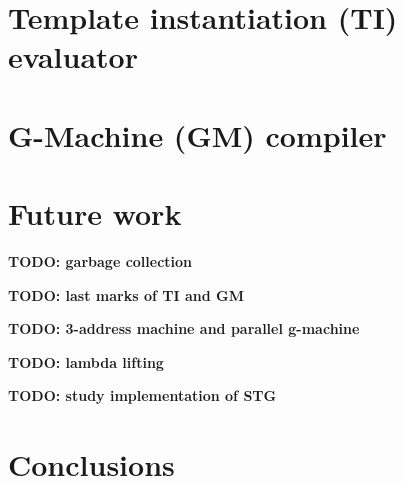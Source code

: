 \documentclass{article}
\newcommand{\todo}[1]{\textbf{TODO: #1}}
\begin{document}
\section{Template instantiation (TI) evaluator}
\label{sec:ti}

\section{G-Machine (GM) compiler}
\label{sec:gm}

\section{Future work}
\label{sec:future-work}

\todo{garbage collection}

\todo{last marks of TI and GM}

\todo{3-address machine and parallel g-machine}

\todo{lambda lifting}

\todo{study implementation of STG}

\section{Conclusions}
\label{sec:conclusions}
\end{document}
